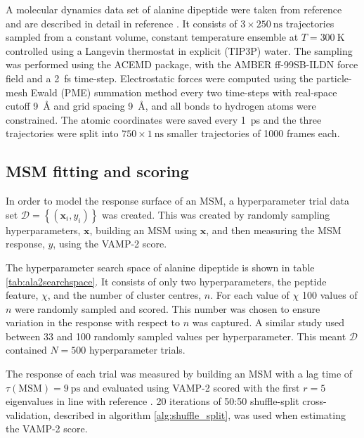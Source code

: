 A molecular dynamics data set  of alanine dipeptide were taken from reference \cite{wehmeyerTimelaggedAutoencodersDeep2018a} and are described in detail in reference \cite{nuskeMarkovStateModels2017b}.  It consists of $3\times \SI{250}{\nano\second}$ trajectories sampled from a constant volume, constant temperature ensemble at $T=\SI{300}{\kelvin}$ controlled using a Langevin thermostat in explicit (TIP3P\cite{jorgensen1983comparison}) water\cite{nuskeMarkovStateModels2017b}. The sampling was performed using the ACEMD\cite{harveyACEMDAcceleratingBiomolecular2009} package, with the AMBER ff-99SB-ILDN\cite{lindorff-larsenImprovedSidechainTorsion2010} force field and a \SI{2}{\femto\second} time-step\cite{nuskeMarkovStateModels2017b}. Electrostatic forces were computed using the particle-mesh Ewald (PME)\cite{dardenParticleMeshEwald1993} summation method every two time-steps with  real-space cutoff \SI{9}{\angstrom} and grid spacing \SI{9}{\angstrom}, and all bonds to hydrogen atoms were constrained\cite{nuskeMarkovStateModels2017b}. The atomic coordinates were saved every \SI{1}{\pico\second} and the three trajectories were split into $750\times\SI{1}{\nano\second}$ smaller trajectories of \num{1000} frames each. 

\subsection{MSM fitting and scoring}\label{subsec:msm_fitting}
In order to  model the response surface of an MSM, a hyperparameter trial data set  $\mathcal{D} = \left\{ (\mathbf{x}_{i}, y_{i}) \right\}$ was created. This was created by  randomly sampling hyperparameters, $\mathbf{x}$, building an MSM using $\mathbf{x}$, and then measuring the MSM response, $y$, using the VAMP-2 score. 

The hyperparameter search space of alanine dipeptide is shown in table \ref{tab:ala2searchspace}. It consists of only two hyperparameters, the peptide feature, $\chi$, and the number of cluster centres, $n$.  For each value of $\chi$ \num{100} values of $n$ were randomly sampled and scored. This number was chosen to ensure variation in the response with respect to $n$ was captured. A similar study\cite{husicOptimizedParameterSelection2016} used between \num{33} and \num{100} randomly sampled values per hyperparameter. This meant $\mathcal{D}$ contained $N=500$ hyperparameter trials.  

The response of each trial was measured by building an MSM with a lag time of $\tau(\mathrm{MSM}) = \SI{9}{\pico\second}$ and evaluated using VAMP-2 scored with the first $r=5$ eigenvalues in line with reference \cite{bowmanQuantitativeComparisonAlternative2013}. \num{20} iterations of 50:50 shuffle-split cross-validation, described in algorithm \ref{alg:shuffle_split}, was used when estimating the VAMP-2 score. 

